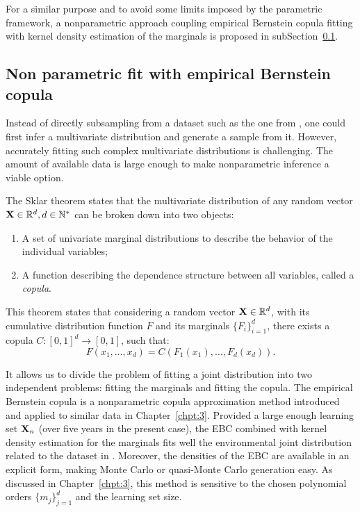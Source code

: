For a similar purpose and to avoid some limits imposed by the parametric framework, 
a nonparametric approach coupling empirical Bernstein copula fitting with kernel density estimation of the marginals is proposed in subSection~\ref{sec:4ebc}.


\subsection{Non parametric fit with empirical Bernstein copula}\label{sec:4ebc}
Instead of directly subsampling from a dataset such as the one from , one could first infer a multivariate distribution and generate a sample from it. 
However, accurately fitting such complex multivariate distributions is challenging. 
The amount of available data is large enough to make nonparametric inference a viable option.

The Sklar theorem \citep{durante_2015_copula} states that the multivariate distribution of any random vector $\mathbf{X} \in \mathbb{R}^d, d \in \mathbb{N}^*$ can be broken down into two objects:
\begin{enumerate}
    \item A set of univariate marginal distributions to describe the behavior of the individual variables;
    \item A function describing the dependence structure between all variables, called a \textit{copula}.
\end{enumerate}
This theorem states that considering a random vector $\mathbf{X} \in \mathbb{R}^d$, with its cumulative distribution function $F$ and its marginals $\{F_i\}_{i=1}^d$, there exists a copula $C: [0, 1]^d \rightarrow [0, 1]$, such that:
\begin{equation}
    F(x_1, \dots, x_d) = C\left(F_1(x_1), \dots, F_d(x_d)\right). 
\end{equation}

It allows us to divide the problem of fitting a joint distribution into two independent problems: fitting the marginals and fitting the copula. 
The empirical Bernstein copula is a nonparametric copula approximation method introduced and applied to similar data in Chapter~\ref{chpt:3}. 
Provided a large enough learning set ${\bf X}_n$ (over five years in the present case), the EBC combined with kernel density estimation for the marginals fits well the environmental joint distribution related to the dataset in . 
Moreover, the densities of the EBC are available in an explicit form, making Monte Carlo or quasi-Monte Carlo generation easy. 
As discussed in Chapter~\ref{chpt:3}, this method is sensitive to the chosen polynomial orders $\{m_j\}_{j=1}^d$ and the learning set size. 


